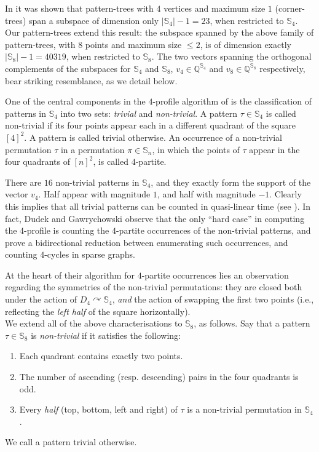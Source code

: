 \documentclass{article}
\newcommand{\QQ}{\mathbb{Q}}
\theoremstyle{remark}
\def\acts{\curvearrowright}
\theoremstyle{plain}
\begin{document}
In \cite{even2021counting} it was shown that pattern-trees with $4$ vertices and maximum size $1$ (corner-trees)
span a subspace of dimension only $|\mathbb{S}_4|-1 = 23$, when restricted to $\mathbb{S}_4$.
Our pattern-trees extend this result: 
the subspace spanned by the above family of pattern-trees,
with $8$ points and maximum size $\le 2$,
is of dimension exactly $|\mathbb{S}_8|-1 = 40319$, when restricted to $\mathbb{S}_8$.
The two vectors
spanning the orthogonal complements of the subspaces for $\mathbb{S}_4$ and $\mathbb{S}_8$,
$v_4 \in \QQ^{\mathbb{S}_4}$ and $v_8 \in \QQ^{\mathbb{S}_8}$ respectively,
bear striking resemblance, as we detail below.

One of the central components in the $4$-profile algorithm of \cite{dudek2020counting} is the 
classification of patterns in $\mathbb{S}_4$ into two sets: \textit{trivial} and \textit{non-trivial}.
A pattern $\tau \in \mathbb{S}_4$ is called non-trivial
if its four points appear each in a different quadrant of the square $[4]^2$.
A pattern is called trivial otherwise.
An occurrence of a non-trivial permutation $\tau$ in a permutation $\pi \in \mathbb{S}_n$, in which
the points of $\tau$ appear in the four quadrants of $[n]^2$, is called $4$-partite.

There are $16$ non-trivial patterns in $\mathbb{S}_4$, and they exactly form the support of the vector $v_4$.
Half appear with magnitude $1$, and half with magnitude $-1$. Clearly this implies that all trivial patterns
can be counted in quasi-linear time (see ).
In fact, Dudek and Gawrychowski \cite{dudek2020counting} observe that the only ``hard case'' in computing the $4$-profile
is counting the $4$-partite occurrences of the non-trivial patterns, 
and prove a  bidirectional reduction between enumerating such occurrences, and counting $4$-cycles in sparse graphs.

At the heart of their algorithm for $4$-partite occurrences
lies an observation regarding the symmetries of the non-trivial permutations:
they are closed both under the action of $D_4 \acts \mathbb{S}_4$,
\textit{and} the action of swapping the first two points
(i.e., reflecting the \textit{left half} of the square horizontally). \ \\

We extend all of the above characterisations to $\mathbb{S}_8$, as follows.
Say that a pattern $\tau \in \mathbb{S}_8$ is \textit{non-trivial} if it
satisfies the following:

\begin{enumerate}
    \item Each quadrant contains exactly two points.
    \item The number of ascending (resp. descending) pairs in the four quadrants is odd.
    \item Every \textit{half} (top, bottom, left and right) of $\tau$ is a non-trivial permutation in $\mathbb{S}_4$.
\end{enumerate}
We call a pattern trivial otherwise.
\end{document}
